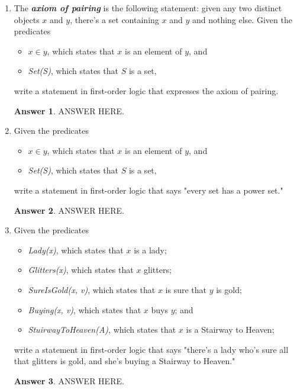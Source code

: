 \documentclass[a4paper]{article}
\renewcommand{\(}{\left(}
\renewcommand{\)}{\right)}
\theoremstyle{plain}
\theoremstyle{plain}
\theoremstyle{definition}
\newtheorem*{answer}{Answer}
\begin{document}
\begin{enumerate}[label*=\roman*.,ref=\roman*]
\item The \textbf{\textit{axiom of pairing}} is the following statement: given any two distinct objects $x$ and $y$, there's a set containing $x$ and $y$ and nothing else. Given the predicates
\begin{itemize}
  \item[] $x \in y$, which states that $x$ is an element of $y$, and
  \item[] \textit{Set(S)}, which states that $S$ is a set,
\end{itemize}
    write a statement in first-order logic that expresses the axiom of pairing.
\begin{shaded}
\begin{answer}
ANSWER HERE.
\end{answer}
\end{shaded}

\item Given the predicates
\begin{itemize}
\item[] $x \in  y$, which states that $x$ is an element of $y$, and
\item[] \textit{Set(S)}, which states that $S$ is a set,
\end{itemize}
write a statement in first-order logic that says "every set has a power set."
\begin{shaded}
\begin{answer}
ANSWER HERE.
\end{answer}
\end{shaded}

\item Given the predicates
\begin{itemize}
\item[] \textit{Lady(x)}, which states that $x$ is a lady;
\item[] \textit{Glitters(x)}, which states that $x$ glitters;
\item[] \textit{SureIsGold(x, v)}, which states that $x$ is sure that $y$ is gold;
\item[] \textit{Buying(x, v)}, which states that $x$ buys $y$; and
\item[] \textit{StuirwayToHeaven(A)}, which states that $x$ is a Stairway to Heaven;
\end{itemize}
write a statement in first-order logic that says "there's a lady who's sure all that glitters is gold, and she's buying a Stairway to Heaven."
\begin{shaded}
\begin{answer}
ANSWER HERE.
\end{answer}
\end{shaded}

\end{enumerate}
\end{document}
